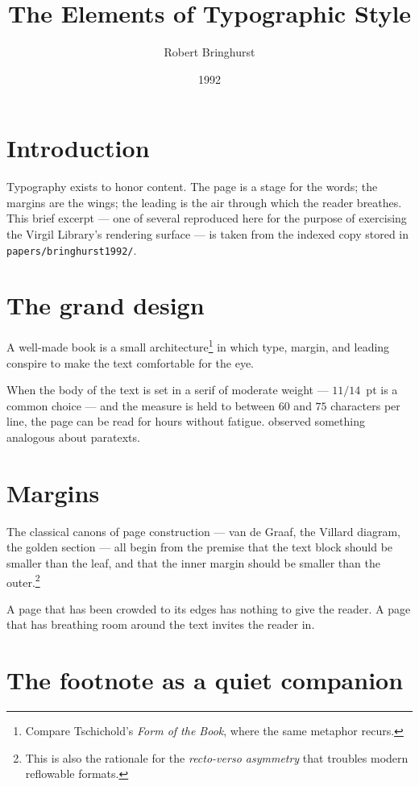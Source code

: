 \documentclass{article}
\title{The Elements of Typographic Style}
\author{Robert Bringhurst}
\date{1992}
\begin{document}
\maketitle

\section*{Introduction}

Typography exists to honor content. The page is a stage for the words; the
margins are the wings; the leading is the air through which the reader
breathes. This brief excerpt --- one of several reproduced here for the
purpose of exercising the Virgil Library's rendering surface --- is taken
from the indexed copy stored in \texttt{papers/bringhurst1992/}.

\section{The grand design}

A well-made book is a small architecture\footnote{Compare Tschichold's
\emph{Form of the Book}, where the same metaphor recurs.} in which type,
margin, and leading conspire to make the text comfortable for the eye.

When the body of the text is set in a serif of moderate
weight --- $11/14$~pt is a common choice --- and the measure is held to
between $60$ and $75$ characters per line, the page can be read for hours
without fatigue. \cite{genette1997} observed something analogous about
paratexts.

\section{Margins}

The classical canons of page construction --- van de Graaf, the Villard
diagram, the golden section --- all begin from the premise that the
text block should be smaller than the leaf, and that the inner margin
should be smaller than the outer.\footnote{This is also the rationale
for the \emph{recto-verso asymmetry} that troubles modern reflowable
formats.}

A page that has been crowded to its edges has nothing to give
the reader. A page that has breathing room around the text invites the
reader in.

\section{The footnote as a quiet companion}
\end{document}
